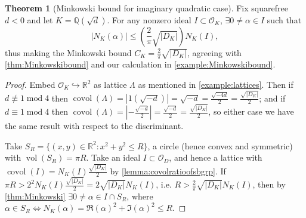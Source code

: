 \documentclass{article}
\newcommand{\Q}{\mathbb{Q}}
\newcommand{\R}{\mathbb{R}}
\newcommand{\Mod}{\operatorname{mod}}
\newcommand{\vol}{\operatorname{vol}}
\newcommand{\covol}{\operatorname{covol}}
\newcommand{\ri}{\mathcal{O}}
\theoremstyle{definition}
\newtheorem{thm}[defn]{Theorem}
\begin{document}
\begin{thm}[Minkowski bound for imaginary quadratic case]
Fix squarefree $d<0$ and let $K=\Q\left(\sqrt d\right)$. For any nonzero ideal $I\subset\ri_K$, $\exists 0\neq\alpha\in I$ such that
\[
|N_K(\alpha)|\leq\left(\frac{2}{\pi}\sqrt{|D_K|}\right)N_K(I),
\]
thus making the Minkowski bound $C_K=\frac{2}{\pi}\sqrt{|D_K|}$, agreeing with \ref{thm:Minkowskibound} and our calculation in \ref{example:Minkowskibound}.
\end{thm}
\begin{proof}
Embed $\ri_K\hookrightarrow\R^2$ as lattice $\Lambda$ as mentioned in \ref{example:lattices}. Then if $d\not\equiv 1\Mod 4$ then $\covol(\Lambda)=|1(\sqrt{-d})|=\sqrt{-d}=\frac{\sqrt{-4d}}{2}=\frac{\sqrt{|D_K|}}{2}$; and if $d\equiv 1\Mod 4$ then $\covol(\Lambda)=\left|-\frac{\sqrt{-d}}{2}\right|=\frac{\sqrt{-d}}{2}=\frac{\sqrt{|D_K|}}{2}$, so either case we have the same result with respect to the discriminant.

Take $S_R=\{(x,y)\in\R^2:x^2+y^2\leq R\}$, a circle (hence convex and symmetric) with $\vol(S_R)=\pi R$. Take an ideal $I\subset\ri_D$, and hence a lattice with $\covol(I)=N_K(I)\frac{\sqrt{|D_K|}}{2}$ by \ref{lemma:covolratioofsbgrp}. If $\pi R>2^2N_K(I)\frac{\sqrt{|D_K|}}{2}=2\sqrt{|D_K|}N_K(I)$, i.e. $R>\frac{2}{\pi}\sqrt{|D_K|}N_K(I)$, then by \ref{thm:Minkowski} $\exists 0\neq\alpha\in I\cap S_R$, where $\alpha\in S_R\iff N_K(\alpha)=\Re(\alpha)^2+\Im(\alpha)^2\leq R$.
\end{proof}
\end{document}
